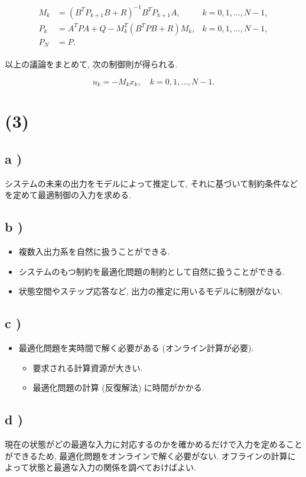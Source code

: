 \documentclass[10pt, fleqn, dvipdfmx]{article}
\begin{document}
\begin{align}
	\begin{aligned}
		M_k & = (B^T P_{k+1} B + R)^{-1} B^T P_{k+1} A,
		    & k = 0, 1, \dots, N-1,                     \\
		P_k & = A^T P A + Q - M_k^T (B^T P B + R) M_k,
		    & k = 0, 1, \dots, N-1,                     \\
		P_N & = P.
	\end{aligned}
	\label{fom2-6}
\end{align}

以上の議論をまとめて, 次の制御則が得られる.

\begin{equation}
	u_k = - M_k x_k, \quad k = 0, 1, \dots, N-1.
\end{equation}

\section*{(3)}

\subsection*{a )}

システムの未来の出力をモデルによって推定して,
それに基づいて制約条件などを定めて最適制御の入力を求める.

\subsection*{b )}

\begin{itemize}
	\item 複数入出力系を自然に扱うことができる.
	\item システムのもつ制約を最適化問題の制約として自然に扱うことができる.
	\item 状態空間やステップ応答など, 出力の推定に用いるモデルに制限がない.
\end{itemize}

\subsection*{c )}

\begin{itemize}
	\item 最適化問題を実時間で解く必要がある (オンライン計算が必要).
	      \begin{itemize}
		      \item 要求される計算資源が大きい.
		      \item 最適化問題の計算 (反復解法) に時間がかかる.
	      \end{itemize}
\end{itemize}

\subsection*{d )}

現在の状態がどの最適な入力に対応するのかを確かめるだけで入力を定めることができるため,
最適化問題をオンラインで解く必要がない.
オフラインの計算によって状態と最適な入力の関係を調べておけばよい.
\end{document}
